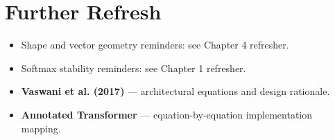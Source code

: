 \section*{Further Refresh}
\begin{itemize}[leftmargin=1.5em]
  \item Shape and vector geometry reminders: see Chapter 4 refresher.
  \item Softmax stability reminders: see Chapter 1 refresher.
  \item \textbf{Vaswani et al. (2017)} --- architectural equations and design rationale.
  \item \textbf{Annotated Transformer} --- equation-by-equation implementation mapping.
\end{itemize}
